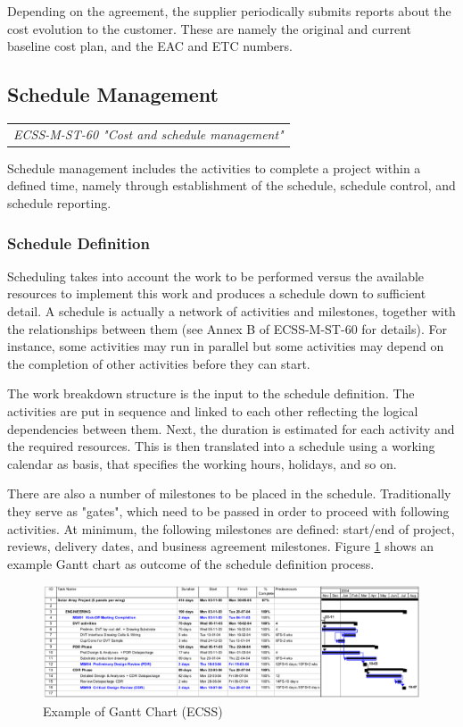 Depending on the agreement, the supplier periodically submits reports about the cost evolution to the customer. These are namely the original and current baseline cost plan, and the EAC and ETC numbers.

\subsection{Schedule Management}

\begin{tabular}{l}
\textit{ECSS-M-ST-60 "Cost and schedule management" \cite{ECSS-M-ST-60}}
\end{tabular}

Schedule management includes the activities to complete a project within a defined time, namely through establishment of the schedule, schedule control, and schedule reporting. 

\subsubsection{Schedule Definition}

Scheduling takes into account the work to be performed versus the available resources to implement this work and produces a schedule down to sufficient detail. A schedule is actually a network of activities and milestones, together with the relationships between them (see Annex B of ECSS-M-ST-60 for details). For instance, some activities may run in parallel but some activities may depend on the completion of other activities before they can start. 

The work breakdown structure is the input to the schedule definition. The activities are put in sequence and linked to each other reflecting the logical dependencies between them. Next, the duration is estimated for each activity and the required resources. This is then translated into a schedule using a working calendar as basis, that specifies the working hours, holidays, and so on. 

There are also a number of milestones to be placed in the schedule. Traditionally they serve as "gates", which need to be passed in order to proceed with following activities. At minimum, the following milestones are defined: start/end of project, reviews, delivery dates, and business agreement milestones. Figure \ref{fig:Example of Gantt Chart} shows an example Gantt chart as outcome of the schedule definition process.

\begin{figure}[h]
\centering\includegraphics[scale=0.3]{fig/example_of_gantt_chart}
\caption{Example of Gantt Chart (ECSS)}
\label{fig:Example of Gantt Chart}
\end{figure}

